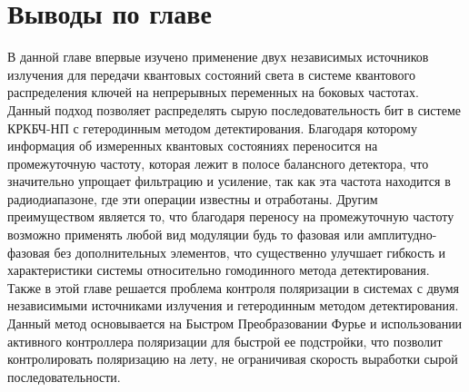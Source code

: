 \section{Выводы по главе}\label{sec:ch3/sect8}
В данной главе впервые изучено применение двух независимых источников излучения для передачи квантовых состояний света в системе квантового распределения ключей на непрерывных переменных на боковых частотах. Данный подход позволяет распределять сырую последовательность бит в системе КРКБЧ-НП с гетеродинным методом детектирования. 
Благодаря которому информация об измеренных квантовых состояниях переносится на промежуточную частоту, которая лежит в полосе балансного детектора, что значительно упрощает фильтрацию и усиление, так как эта частота находится в радиодиапазоне, где эти операции известны и отработаны. Другим преимуществом является то, что благодаря переносу на промежуточную частоту возможно применять любой вид модуляции будь то фазовая или амплитудно-фазовая без дополнительных элементов, что существенно улучшает гибкость и характеристики системы относительно гомодинного метода детектирования.
Также в этой главе решается проблема контроля поляризации в системах с двумя независимыми источниками излучения и гетеродинным методом детектирования. Данный метод основывается на Быстром Преобразовании Фурье и использовании активного контроллера поляризации для быстрой ее подстройки, что позволит контролировать поляризацию на лету, не ограничивая скорость выработки сырой последовательности.